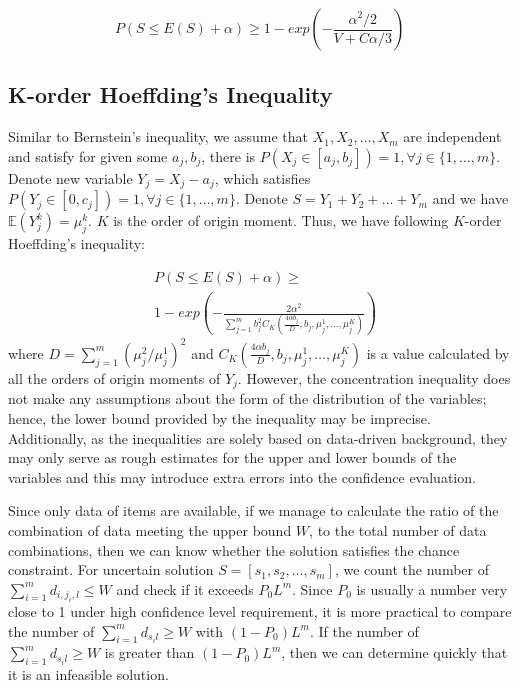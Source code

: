 \documentclass[lettersize,journal]{IEEEtran}
\begin{document}
\begin{equation}\label{eqa:Bernstein}
    P(S\leq E(S)+\alpha)\geq 1-exp(-\frac{\alpha^2/2}{V+C\alpha /3})
\end{equation}

\subsection{K-order Hoeffding's Inequality}
Similar to Bernstein's inequality, we assume that $X_1,X_2,\ldots,X_m$ are independent and satisfy for given some $a_j,b_j$, there is $P(X_j\in [a_j,b_j])=1, \forall{j}\in\{1,\ldots,m\}$. 
Denote new variable $Y_j=X_j-a_j$, which satisfies $P(Y_j\in [0,c_j])=1,\forall{j}\in\{1,\ldots,m\}$. 
Denote $S=Y_1+Y_2+\ldots+Y_m$ and we have $\mathbb{E}(Y_j^k)=\mu _j^k$. $K$ is the order of origin moment. 
Thus, we have following $K$-order Hoeffding's inequality:

\begin{equation}\label{eqa:Hoeffding}
\begin{aligned}
    & P(S\leq E(S)+\alpha)\geq \\
    & 1-exp(-\frac{2\alpha^2}{\sum_{j=1}^m b_j^2 C_K(\frac{4\alpha b_j}{D},b_j,\mu_j^1,\ldots,\mu_j^K)})
\end{aligned}
\end{equation}
where $D=\sum_{j=1}^m(\mu_j^2/\mu_j^1)^2$ and $C_K(\frac{4\alpha b_j}{D},b_j,\mu_j^1,\ldots,\mu_j^K)$ is a value calculated by all the orders of origin moments of $Y_j$.
However, the concentration inequality does not make any assumptions about the form of the distribution of the variables; hence, the lower bound provided by the inequality may be imprecise. Additionally, as the inequalities are solely based on data-driven background, they may only serve as rough estimates for the upper and lower bounds of the variables and this may introduce extra errors into the confidence evaluation.

Since only data of items are available, if we manage to calculate the ratio of the combination of data meeting the upper bound $W$, to the total number of data combinations, then we can know whether the solution satisfies the chance constraint. 
For uncertain solution $S=[s_1,s_2,\ldots,s_m]$, we count the number of $\sum_{i=1}^{m}d_{i,j_i,l}\leq W$ and check if it exceeds $P_0L^m$. 
Since $P_0$ is usually a number very close to 1 under high confidence level requirement, it is more practical to  compare the number of $\sum_{i=1}^{m}d_{s_il}\geq W$ with $(1-P_0)L^m$. 
If the number of $\sum_{i=1}^{m}d_{s_il}\geq W$ is greater than $(1-P_0)L^m$, then we can determine quickly that it is an infeasible solution.
\end{document}
